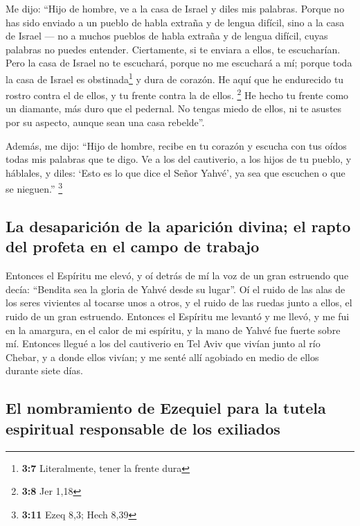 \begin{paracol}{2}
 Me dijo: ``Hijo de hombre, ve a la casa de Israel y diles
mis palabras.  Porque no has sido enviado a un pueblo de
habla extraña y de lengua difícil, sino a la casa de Israel ---
 no a muchos pueblos de habla extraña y de lengua difícil,
cuyas palabras no puedes entender. Ciertamente, si te enviara a ellos,
te escucharían.  Pero la casa de Israel no te escuchará,
porque no me escuchará a mí; porque toda la casa de Israel es
obstinada\footnote{\textbf{3:7} Literalmente, tener la frente dura} y
dura de corazón.  He aquí que he endurecido tu rostro
contra el de ellos, y tu frente contra la de ellos. \footnote{\textbf{3:8}
  Jer 1,18}  He hecho tu frente como un diamante, más duro
que el pedernal. No tengas miedo de ellos, ni te asustes por su aspecto,
aunque sean una casa rebelde''.

 Además, me dijo: ``Hijo de hombre, recibe en tu corazón
y escucha con tus oídos todas mis palabras que te digo. 
Ve a los del cautiverio, a los hijos de tu pueblo, y háblales, y diles:
`Esto es lo que dice el Señor Yahvé', ya sea que escuchen o que se
nieguen.'' \footnote{\textbf{3:11} Ezeq 8,3; Hech 8,39}

\hypertarget{la-desapariciuxf3n-de-la-apariciuxf3n-divina-el-rapto-del-profeta-en-el-campo-de-trabajo}{%
\subsection{La desaparición de la aparición divina; el rapto del profeta
en el campo de
trabajo}\label{la-desapariciuxf3n-de-la-apariciuxf3n-divina-el-rapto-del-profeta-en-el-campo-de-trabajo}}

 Entonces el Espíritu me elevó, y oí detrás de mí la voz
de un gran estruendo que decía: ``Bendita sea la gloria de Yahvé desde
su lugar''.  Oí el ruido de las alas de los seres
vivientes al tocarse unos a otros, y el ruido de las ruedas junto a
ellos, el ruido de un gran estruendo.  Entonces el
Espíritu me levantó y me llevó, y me fui en la amargura, en el calor de
mi espíritu, y la mano de Yahvé fue fuerte sobre mí. 
Entonces llegué a los del cautiverio en Tel Aviv que vivían junto al río
Chebar, y a donde ellos vivían; y me senté allí agobiado en medio de
ellos durante siete días.

\hypertarget{el-nombramiento-de-ezequiel-para-la-tutela-espiritual-responsable-de-los-exiliados}{%
\subsection{El nombramiento de Ezequiel para la tutela espiritual
responsable de los
exiliados}\label{el-nombramiento-de-ezequiel-para-la-tutela-espiritual-responsable-de-los-exiliados}}


\end{paracol}
